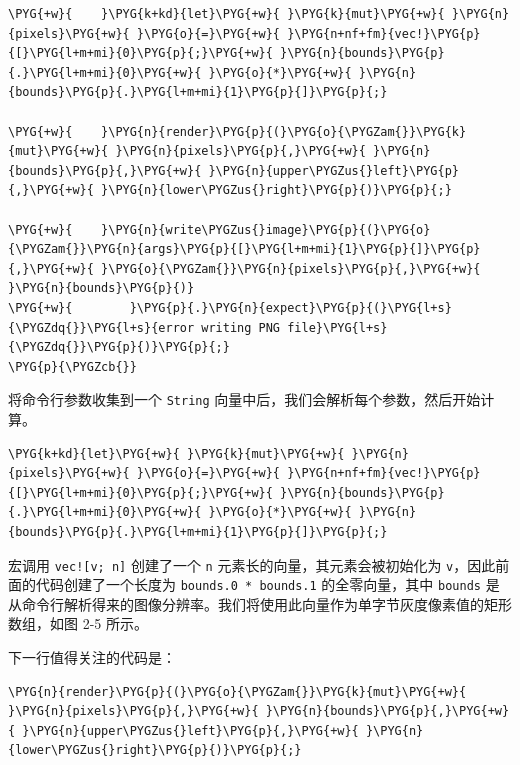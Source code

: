\begin{Verbatim}[commandchars=\\\{\},breaklines=true,breakanywhere=true,fontsize=\codefont,xleftmargin=17bp]
\PYG{+w}{    }\PYG{k+kd}{let}\PYG{+w}{ }\PYG{k}{mut}\PYG{+w}{ }\PYG{n}{pixels}\PYG{+w}{ }\PYG{o}{=}\PYG{+w}{ }\PYG{n+nf+fm}{vec!}\PYG{p}{[}\PYG{l+m+mi}{0}\PYG{p}{;}\PYG{+w}{ }\PYG{n}{bounds}\PYG{p}{.}\PYG{l+m+mi}{0}\PYG{+w}{ }\PYG{o}{*}\PYG{+w}{ }\PYG{n}{bounds}\PYG{p}{.}\PYG{l+m+mi}{1}\PYG{p}{]}\PYG{p}{;}

\PYG{+w}{    }\PYG{n}{render}\PYG{p}{(}\PYG{o}{\PYGZam{}}\PYG{k}{mut}\PYG{+w}{ }\PYG{n}{pixels}\PYG{p}{,}\PYG{+w}{ }\PYG{n}{bounds}\PYG{p}{,}\PYG{+w}{ }\PYG{n}{upper\PYGZus{}left}\PYG{p}{,}\PYG{+w}{ }\PYG{n}{lower\PYGZus{}right}\PYG{p}{)}\PYG{p}{;}

\PYG{+w}{    }\PYG{n}{write\PYGZus{}image}\PYG{p}{(}\PYG{o}{\PYGZam{}}\PYG{n}{args}\PYG{p}{[}\PYG{l+m+mi}{1}\PYG{p}{]}\PYG{p}{,}\PYG{+w}{ }\PYG{o}{\PYGZam{}}\PYG{n}{pixels}\PYG{p}{,}\PYG{+w}{ }\PYG{n}{bounds}\PYG{p}{)}
\PYG{+w}{        }\PYG{p}{.}\PYG{n}{expect}\PYG{p}{(}\PYG{l+s}{\PYGZdq{}}\PYG{l+s}{error writing PNG file}\PYG{l+s}{\PYGZdq{}}\PYG{p}{)}\PYG{p}{;}
\PYG{p}{\PYGZcb{}}
\end{Verbatim}

将命令行参数收集到一个 \texttt{String} 向量中后，我们会解析每个参数，然后开始计算。

\begin{Verbatim}[commandchars=\\\{\},breaklines=true,breakanywhere=true,fontsize=\codefont,xleftmargin=17bp]
\PYG{k+kd}{let}\PYG{+w}{ }\PYG{k}{mut}\PYG{+w}{ }\PYG{n}{pixels}\PYG{+w}{ }\PYG{o}{=}\PYG{+w}{ }\PYG{n+nf+fm}{vec!}\PYG{p}{[}\PYG{l+m+mi}{0}\PYG{p}{;}\PYG{+w}{ }\PYG{n}{bounds}\PYG{p}{.}\PYG{l+m+mi}{0}\PYG{+w}{ }\PYG{o}{*}\PYG{+w}{ }\PYG{n}{bounds}\PYG{p}{.}\PYG{l+m+mi}{1}\PYG{p}{]}\PYG{p}{;}
\end{Verbatim}

宏调用 \texttt{vec![v; n]} 创建了一个 \texttt{n} 元素长的向量，其元素会被初始化为 \texttt{v}，因此前面的代码创建了一个长度为 \texttt{bounds.0 * bounds.1} 的全零向量，其中 \texttt{bounds} 是从命令行解析得来的图像分辨率。我们将使用此向量作为单字节灰度像素值的矩形数组，如图 2-5 所示。


下一行值得关注的代码是：

\begin{Verbatim}[commandchars=\\\{\},breaklines=true,breakanywhere=true,fontsize=\codefont,xleftmargin=17bp]
\PYG{n}{render}\PYG{p}{(}\PYG{o}{\PYGZam{}}\PYG{k}{mut}\PYG{+w}{ }\PYG{n}{pixels}\PYG{p}{,}\PYG{+w}{ }\PYG{n}{bounds}\PYG{p}{,}\PYG{+w}{ }\PYG{n}{upper\PYGZus{}left}\PYG{p}{,}\PYG{+w}{ }\PYG{n}{lower\PYGZus{}right}\PYG{p}{)}\PYG{p}{;}
\end{Verbatim}


